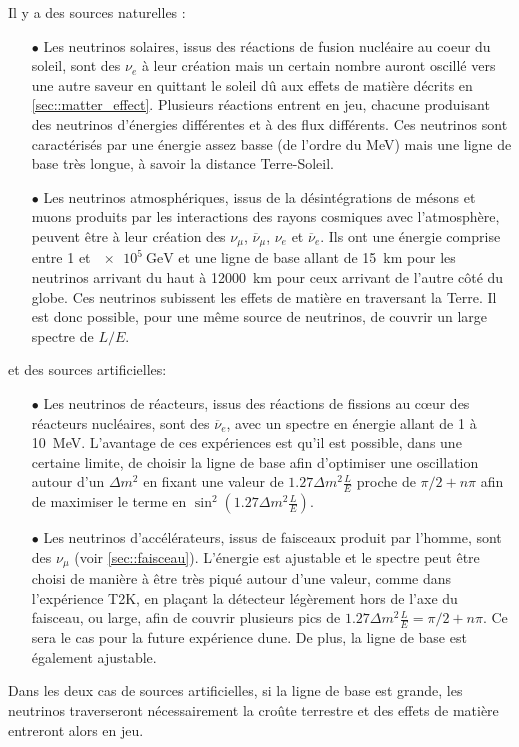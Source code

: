 		     Il y a des sources naturelles :
		    \begin{itemize}
		    	\item[$\bullet$] Les neutrinos solaires, issus des réactions de fusion nucléaire au coeur du soleil, sont des $\nu_e$ à leur création mais un certain nombre auront oscillé vers une autre saveur en quittant le soleil dû aux effets de matière décrits en \autoref{sec::matter_effect}. Plusieurs réactions entrent en jeu, chacune produisant des neutrinos d'énergies différentes et à des flux différents. %
		    	Ces neutrinos sont caractérisés par une énergie assez basse (de l'ordre du \si{\mega\electronvolt}) mais une ligne de base très longue, à savoir la distance Terre-Soleil.
		    	\item[$\bullet$] Les neutrinos atmosphériques, issus de la désintégrations de mésons et muons produits par les interactions des rayons cosmiques avec l'atmosphère, peuvent être à leur création des $\nu_{\mu}$, $\overline{\nu}_{\mu}$, $\nu_e$ et $\overline{\nu}_e$. Ils ont une énergie comprise entre 1 et $\SI{e5}{\giga\electronvolt}$ et une ligne de base allant de \SI{15}{\kilo\meter} pour les neutrinos arrivant du haut à \SI{12000}{\kilo\meter} pour ceux arrivant de l'autre côté du globe. Ces neutrinos subissent les effets de matière en traversant la Terre. Il est donc possible, pour une même source de neutrinos, de couvrir un large spectre de $L/E$. %
		    \end{itemize}
		    
		    et des sources artificielles:
		    \begin{itemize}
		    	\item[$\bullet$] Les neutrinos de réacteurs, issus des réactions de fissions au cœur des réacteurs nucléaires, sont des $\overline{\nu}_e$, avec un spectre en énergie allant de 1 à \SI{10}{\mega\electronvolt}.
		    	L'avantage de ces expériences est qu'il est possible, dans une certaine limite, de choisir la ligne de base afin d'optimiser une oscillation autour d'un $\Delta m^2$ en fixant une valeur de $1.27\Delta m^2\frac{L}{E}$ proche de $\pi/2+n\pi$ afin de maximiser le terme en $\sin^2(1.27\Delta m^2\frac{L}{E})$.
		    	\item[$\bullet$] Les neutrinos d'accélérateurs, issus de faisceaux produit par l'homme, sont des $\nu_{\mu}$ (voir \autoref{sec::faisceau}). L'énergie est ajustable et le spectre peut être choisi de manière à être très piqué autour d'une valeur, comme dans l'expérience T2K, en plaçant la détecteur légèrement hors de l'axe du faisceau\cite{McDonald2001}, ou large, afin de couvrir plusieurs pics de $1.27\Delta m^2\frac{L}{E}=\pi/2+n\pi$. Ce sera le cas pour la future expérience \gls{dune}. De plus, la ligne de base est également ajustable.
		    \end{itemize}
		    Dans les deux cas de sources artificielles, si la ligne de base est grande, les neutrinos traverseront nécessairement la croûte terrestre et des effets de matière entreront alors en jeu.
		    
